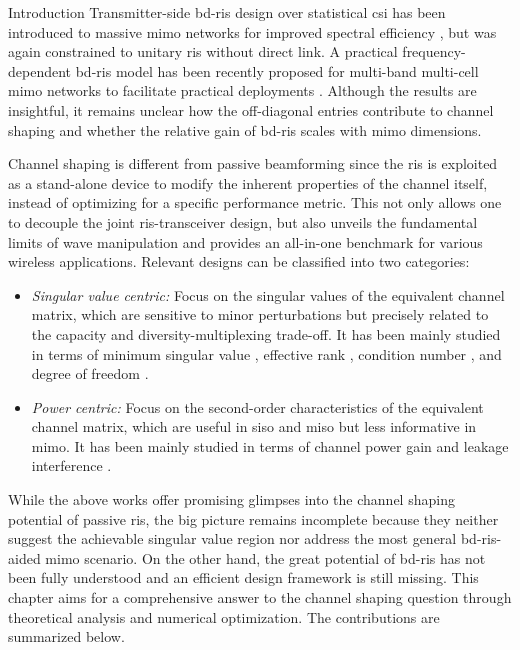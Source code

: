 \documentclass[journal]{IEEEtran}
\begin{document}
\begin{section}{Introduction}
	Transmitter-side \gls{bd}-\gls{ris} design over statistical \gls{csi} has been introduced to massive \gls{mimo} networks for improved spectral efficiency \cite{Mishra2024}, but was again constrained to unitary \gls{ris} without direct link.
	A practical frequency-dependent \gls{bd}-\gls{ris} model has been recently proposed for multi-band multi-cell \gls{mimo} networks to facilitate practical deployments \cite{Sena2024}.
	Although the results are insightful, it remains unclear how the off-diagonal entries contribute to channel shaping and whether the relative gain of \gls{bd}-\gls{ris} scales with \gls{mimo} dimensions.

	Channel shaping is different from passive beamforming since the \gls{ris} is exploited as a stand-alone device to modify the inherent properties of the channel itself, instead of optimizing for a specific performance metric.
	This not only allows one to decouple the joint \gls{ris}-transceiver design, but also unveils the fundamental limits of wave manipulation and provides an all-in-one benchmark for various wireless applications.
	Relevant designs can be classified into two categories:
	\begin{itemize}
		\item \emph{Singular value centric:} Focus on the singular values of the equivalent channel matrix, which are sensitive to minor perturbations but precisely related to the capacity and diversity-multiplexing trade-off. It has been mainly studied in terms of minimum singular value \cite{ElMossallamy2021}, effective rank \cite{ElMossallamy2021,Meng2023}, condition number \cite{Zheng2022,Huang2023}, and degree of freedom \cite{Bafghi2022,Zheng2023,Chae2023}.
		\item \emph{Power centric:} Focus on the second-order characteristics of the equivalent channel matrix, which are useful in \gls{siso} and \gls{miso} but less informative in \gls{mimo}. It has been mainly studied in terms of channel power gain \cite{Wu2019,Shen2020a,Nerini2023,Nerini2024,Santamaria2023} and leakage interference \cite{Santamaria2023a}.
	\end{itemize}

	While the above works offer promising glimpses into the channel shaping potential of passive \gls{ris}, the big picture remains incomplete because they neither suggest the achievable singular value region nor address the most general \gls{bd}-\gls{ris}-aided \gls{mimo} scenario.
	On the other hand, the great potential of \gls{bd}-\gls{ris} has not been fully understood and an efficient design framework is still missing.
	This chapter aims for a comprehensive answer to the channel shaping question through theoretical analysis and numerical optimization.
	The contributions are summarized below.




\end{section}
\end{document}
